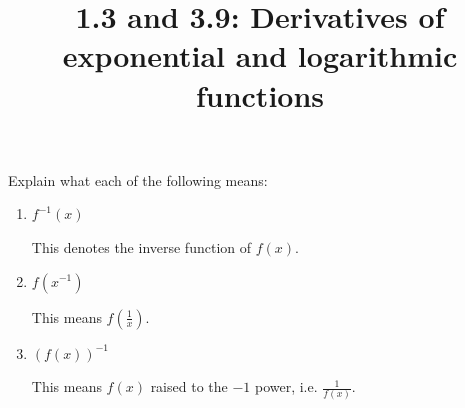 \documentclass[nooutcomes]{ximera}
\title{1.3 and 3.9: Derivatives of exponential and logarithmic functions}
\begin{document}
\begin{abstract}		\end{abstract}
\maketitle

\begin{problem}
Explain what each of the following means:

  \begin{enumerate}

  \item $f^{-1}(x)$
    \begin{freeResponse}
      This denotes the inverse function of $f(x)$.
    \end{freeResponse}
		
  \item $f(x^{-1})$
    \begin{freeResponse}
      This means $f \left( \frac{1}{x} \right)$.
    \end{freeResponse}
		
  \item $\left( f(x) \right)^{-1}$
    \begin{freeResponse}
      This means $f(x)$ raised to the $-1$ power,
      i.e. $\frac{1}{f(x)}$.
    \end{freeResponse}
  \end{enumerate}
\end{problem}
\end{document}
